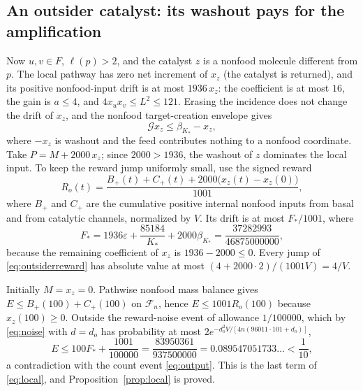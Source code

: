 \documentclass[11pt,letterpaper]{article}
\theoremstyle{plain}
\theoremstyle{definition}
\theoremstyle{remark}
\numberwithin{equation}{section}
\newcommand{\cF}{\mathcal F}
\newcommand{\cG}{\mathcal G}
\newcommand{\eps}{\varepsilon}
\begin{document}
\subsection{An outsider catalyst: its washout pays for the amplification}\label{sec:outsider}
Now $u,v\in F$, $\ell(p)>2$, and the catalyst $z$ is a nonfood molecule different from $p$. The local pathway has zero net increment of $x_z$ (the catalyst is returned), and its positive nonfood-input drift is at most $1936\,x_z$: the coefficient is at most $16$, the gain is $a\le4$, and $4x_ux_v\le L^2\le121$. Erasing the incidence does not change the drift of $x_z$, and the nonfood target-creation envelope gives
\begin{equation}\label{eq:outsidercoordinate}
 \cG x_z\le\beta_{K_*}-x_z ,
\end{equation}
where $-x_z$ is washout and the feed contributes nothing to a nonfood coordinate. Take $P=M+2000\,x_z$; since $2000>1936$, the washout of $z$ dominates the local input. To keep the reward jump uniformly small, use the signed reward
\begin{equation}\label{eq:outsiderreward}
 R_o(t)=\frac{B_+(t)+C_+(t)+2000\bigl(x_z(t)-x_z(0)\bigr)}{1001},
\end{equation}
where $B_+$ and $C_+$ are the cumulative positive internal nonfood inputs from basal and from catalytic channels, normalized by $V$. Its drift is at most $F_*/1001$, where
\begin{equation}\label{eq:Fstar}
 F_*=1936\eps+\frac{85184}{K_*}+2000\beta_{K_*}=\frac{37282993}{46875000000},
\end{equation}
because the remaining coefficient of $x_z$ is $1936-2000\le0$. Every jump of \eqref{eq:outsiderreward} has absolute value at most $(4+2000\cdot2)/(1001V)=4/V$.

Initially $M=x_z=0$. Pathwise nonfood mass balance gives $E\le B_+(100)+C_+(100)$ on $\cF_n$, hence $E\le1001R_o(100)$ because $x_z(100)\ge0$. Outside the reward-noise event of allowance $1/100000$, which by \eqref{eq:noise} with $d=d_o$ has probability at most $2e^{-d_o^2V/[4n(96011\cdot101+d_o)]}$,
\begin{equation}\label{eq:outsiderbudget}
 E\le100F_*+\frac{1001}{100000}=\frac{83950361}{937500000}=0.089547051733\ldots<\frac1{10},
\end{equation}
a contradiction with the count event \eqref{eq:output}. This is the last term of \eqref{eq:local}, and Proposition~\ref{prop:local} is proved.
\end{document}
